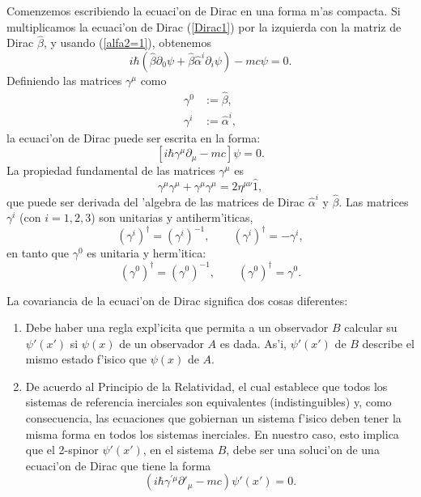 Comenzemos escribiendo la ecuaci'on de Dirac en una forma m'as compacta.
Si multiplicamos la ecuaci'on de Dirac (\ref{Dirac1}) por la izquierda
con la matriz de Dirac $\hat\beta$, y usando (\ref{alfa2=1}), obtenemos
\begin{equation}
i\hbar\left(\hat{\beta}\partial_0\psi+\hat{\beta}\hat{\alpha}^i\partial_i
\psi\right)-mc\psi = 0.
\end{equation}
Definiendo las matrices $\gamma^\mu$ como
\begin{align}
\gamma^0 & :=\hat{\beta},\\
\gamma^i & :=\hat{\alpha}^i,
\end{align}
la ecuaci'on de Dirac puede ser escrita en la forma:
\begin{equation}
\left[ i\hbar\gamma^\mu\partial_\mu -mc\right] \psi =0.
\end{equation}
La propiedad fundamental de las matrices $\gamma^\mu$ es
\begin{equation}
\gamma^\mu\gamma^\mu+\gamma^\mu\gamma^\mu
=2\eta^{\mu\nu}\hat{1}
\label{gammaanticom},
\end{equation}
que puede ser derivada del 'algebra de las matrices de Dirac $\hat\alpha^i$
y $\hat\beta$. Las matrices $\gamma^i$ (con $i=1,2,3$) son unitarias y
antiherm'iticas, 
\begin{equation}
\left( \gamma^i\right)^{\dagger }=\left( \gamma^i\right)^{-1},\qquad
\left( \gamma^i\right)^{\dagger }=-\gamma^i,
\end{equation}
en tanto que $\gamma^0$ es unitaria y herm'itica: 
\begin{equation}
\left( \gamma^0\right)^{\dagger }=\left( \gamma^0\right)^{-1},\qquad
\left( \gamma^0\right)^{\dagger }=\gamma^0.
\end{equation}

La covariancia de la ecuaci'on de Dirac significa dos cosas diferentes:

\begin{enumerate}
\item Debe haber una regla expl'icita que permita a un observador $B$
calcular su $\psi' (x') $ si $\psi \left(
x\right) $ de un observador $A$ es dada. As'i, $\psi' \left(
x' \right) $ de $B$ describe el mismo estado f'isico que $\psi
(x) $ de $A$.

\item De acuerdo al Principio de la Relatividad, el cual establece que todos
los sistemas de referencia inerciales son equivalentes (indistinguibles) y,
como consecuencia, las ecuaciones que gobiernan un sistema f'isico
deben tener la misma forma en todos los sistemas inerciales. En nuestro caso,
esto implica que el 2-spinor $\psi' (x')$, en el
sistema $B$, debe ser una soluci'on de una ecuaci'on de Dirac que tiene la
forma 
\begin{equation}
\left( i\hbar \gamma^{\prime \mu }\partial'_\mu-mc\right) \psi' (x') =0.
\label{Digam}
\end{equation}
\end{enumerate}

